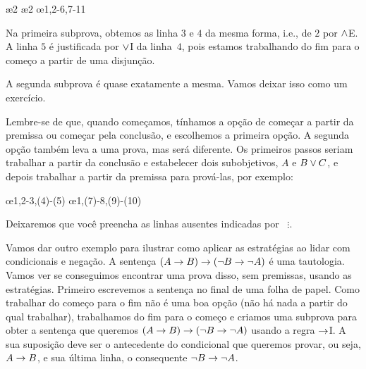 \begin{fitchproof}
	\open
	\ae{2}
	\ae{2}
	\close
	\open
	\ellipsesline
	\close
	\oe{1,2-6,7-11}
\end{fitchproof}
Na primeira subprova, obtemos as linha $3$ e $4$ da mesma forma, i.e.,  de $2$ por  $\wedge$E. A linha $5$  \'e justificada por $\vee$I da linha~$4$, pois estamos trabalhando do fim para o come\c co a partir de uma disjun\c c\~ao.

A segunda subprova \'e quase exatamente a mesma. Vamos deixar isso como um exerc\'icio.

Lembre-se de que, quando come\c camos, t\'inhamos a op\c c\~ao de come\c car a partir da premissa ou come\c car pela conclus\~ao, e escolhemos a primeira op\c c\~ao. A segunda op\c c\~ao tamb\'em leva a uma prova, mas ser\'a diferente. Os primeiros passos seriam trabalhar a partir da conclus\~ao e estabelecer dois subobjetivos, $A$ e $B \vee C$, e depois trabalhar a partir da premissa para prov\'a-las, por exemplo:
 

\begin{fitchproof}
	\open
	\ellipsesline
	\close
	\open
	\ellipsesline
	\close
	\oe{1,2-3,(4)-(5)}
	\open
	\ellipsesline
	\close
	\open
	\ellipsesline
	\close
	\oe{1,(7)-8,(9)-(10)}	
\end{fitchproof}
Deixaremos que voc\^e preencha as linhas ausentes indicadas por ~$\vdots$.

Vamos dar outro exemplo para ilustrar como aplicar as estrat\'egias ao lidar com condicionais e nega\c c\~ao. A senten\c ca $(A \rightarrow B) \rightarrow (\neg B \rightarrow \neg A)$ \'e uma tautologia. 
Vamos ver se conseguimos encontrar uma prova disso, sem premissas, usando as estrat\'egias. Primeiro escrevemos a senten\c ca no final de uma folha de papel. Como trabalhar do come\c co para o fim n\~ao \'e uma boa op\c c\~ao (n\~ao h\'a nada a partir do qual trabalhar), trabalhamos do fim para o come\c co e criamos uma subprova para obter a  senten\c ca que queremos $(A \rightarrow B) \rightarrow (\neg B \rightarrow \neg A)$ usando a regra  $\rightarrow$I. A sua suposi\c c\~ao deve ser o antecedente do condicional que queremos provar, ou seja, $A \rightarrow B$, e sua \'ultima linha, o consequente $\neg B \rightarrow \neg A$.
 

